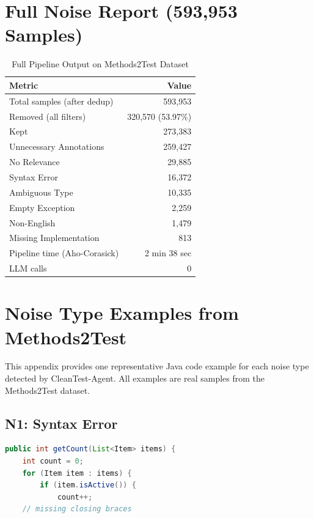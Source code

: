 \documentclass[acmlarge,nonacm,screen]{acmart}
\begin{document}
\section{Full Noise Report (593,953 Samples)}
\label{appendix:full-report}

\begin{table}[H]
\caption{Full Pipeline Output on Methods2Test Dataset}
\label{tab:full-output}
\begin{tabular}{@{}lr@{}}
\toprule
\textbf{Metric} & \textbf{Value} \\
\midrule
Total samples (after dedup) & 593,953 \\
Removed (all filters) & 320,570 (53.97\%) \\
Kept & 273,383 \\
\midrule
Unnecessary Annotations & 259,427 \\
No Relevance & 29,885 \\
Syntax Error & 16,372 \\
Ambiguous Type & 10,335 \\
Empty Exception & 2,259 \\
Non-English & 1,479 \\
Missing Implementation & 813 \\
\midrule
Pipeline time (Aho-Corasick) & 2 min 38 sec \\
LLM calls & 0 \\
\bottomrule
\end{tabular}
\end{table}


\section{Noise Type Examples from Methods2Test}
\label{appendix:noise-examples}

This appendix provides one representative Java code example for each noise type detected by CleanTest-Agent. All examples are real samples from the Methods2Test dataset.

\subsection{N1: Syntax Error}

\begin{lstlisting}[language=Java,caption={Focal method with missing closing brace (intentionally truncated)}]
public int getCount(List<Item> items) {
    int count = 0;
    for (Item item : items) {
        if (item.isActive()) {
            count++;
    // missing closing braces
\end{lstlisting}
\end{document}
